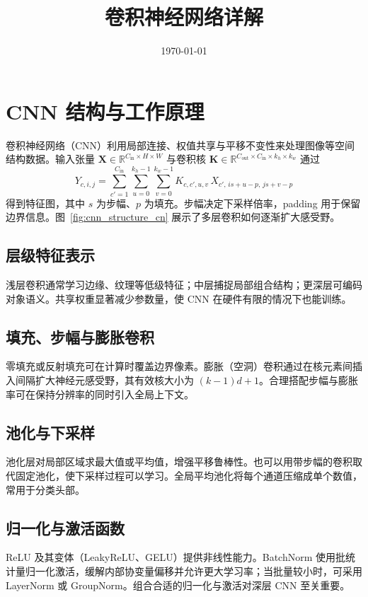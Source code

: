 ﻿\documentclass[UTF8,zihao=-4]{ctexart}
\title{卷积神经网络详解}
\author{}
\date{\today}
\begin{document}
\maketitle

\section{CNN 结构与工作原理}
卷积神经网络（CNN）利用局部连接、权值共享与平移不变性来处理图像等空间结构数据。输入张量 $\mathbf{X} \in \mathbb{R}^{C_{\text{in}} \times H \times W}$ 与卷积核 $\mathbf{K} \in \mathbb{R}^{C_{\text{out}} \times C_{\text{in}} \times k_h \times k_w}$ 通过
\begin{equation}
  Y_{c,i,j} = \sum_{c'=1}^{C_{\text{in}}} \sum_{u=0}^{k_h-1} \sum_{v=0}^{k_w-1} K_{c,c',u,v} \, X_{c',\, i s + u - p,\, j s + v - p}
\end{equation}
得到特征图，其中 $s$ 为步幅、$p$ 为填充。步幅决定下采样倍率，padding 用于保留边界信息。图~\ref{fig:cnn_structure_cn} 展示了多层卷积如何逐渐扩大感受野。

\subsection{层级特征表示}
浅层卷积通常学习边缘、纹理等低级特征；中层捕捉局部组合结构；更深层可编码对象语义。共享权重显著减少参数量，使 CNN 在硬件有限的情况下也能训练。

\subsection{填充、步幅与膨胀卷积}
零填充或反射填充可在计算时覆盖边界像素。膨胀（空洞）卷积通过在核元素间插入间隔扩大神经元感受野，其有效核大小为 $(k-1)d+1$。合理搭配步幅与膨胀率可在保持分辨率的同时引入全局上下文。

\subsection{池化与下采样}
池化层对局部区域求最大值或平均值，增强平移鲁棒性。也可以用带步幅的卷积取代固定池化，使下采样过程可以学习。全局平均池化将每个通道压缩成单个数值，常用于分类头部。

\subsection{归一化与激活函数}
ReLU 及其变体（LeakyReLU、GELU）提供非线性能力。BatchNorm 使用批统计量归一化激活，缓解内部协变量偏移并允许更大学习率；当批量较小时，可采用 LayerNorm 或 GroupNorm。组合合适的归一化与激活对深层 CNN 至关重要。
\end{document}

